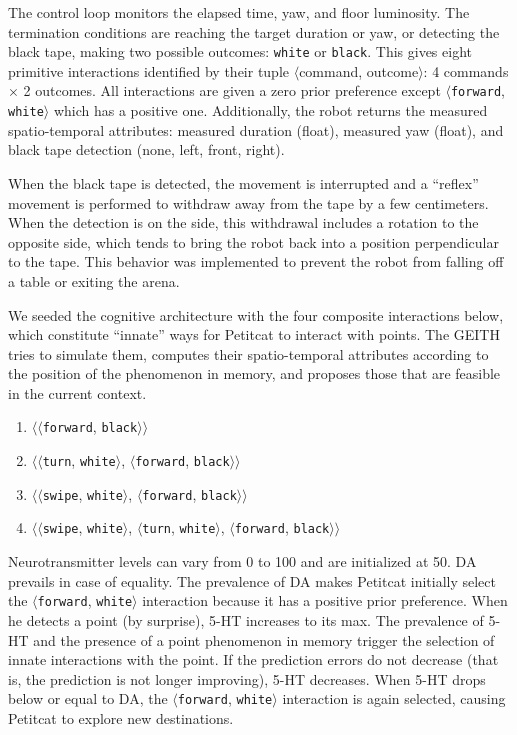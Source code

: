 \documentclass[runningheads]{llncs}
\begin{document}
The control loop monitors the elapsed time, yaw, and floor luminosity. %
The termination conditions are reaching the target duration or yaw, or detecting the black tape, making two possible outcomes: \texttt{white} or \texttt{black}.
This gives eight primitive interactions identified by their tuple $\langle$command, outcome$\rangle$: 4 commands $\times$ 2 outcomes.
All interactions are given a zero prior preference except $\langle$\texttt{forward}, \texttt{white}$\rangle$ which has a positive one.
Additionally, the robot returns the measured spatio-temporal attributes: measured duration (float), measured yaw (float), and black tape detection (none, left, front, right). 

When the black tape is detected, the movement is interrupted and a ``reflex'' movement is performed to withdraw away from the tape by a few centimeters. 
When the detection is on the side, this withdrawal includes a rotation to the opposite side, which tends to bring the robot back into a position perpendicular to the tape. This behavior was implemented to prevent the robot from falling off a table or exiting the arena.

We seeded the cognitive architecture with the four composite interactions below, which constitute ``innate'' ways for Petitcat to interact with points. 
The GEITH tries to simulate them, computes their spatio-temporal attributes according to the position of the phenomenon in memory, and proposes those that are feasible in the current context.
\begin{enumerate}
	\item $\langle\langle$\texttt{forward}, \texttt{black}$\rangle\rangle$
	\item $\langle\langle$\texttt{turn}, \texttt{white}$\rangle$, $\langle$\texttt{forward}, \texttt{black}$\rangle\rangle$
	\item $\langle\langle$\texttt{swipe}, \texttt{white}$\rangle$, $\langle$\texttt{forward}, \texttt{black}$\rangle\rangle$
	\item $\langle\langle$\texttt{swipe}, \texttt{white}$\rangle$, $\langle$\texttt{turn}, \texttt{white}$\rangle$, $\langle$\texttt{forward}, \texttt{black}$\rangle\rangle$
\end{enumerate}

Neurotransmitter levels can vary from 0 to 100 and are initialized at 50. DA prevails in case of equality.
The prevalence of DA makes Petitcat initially select the $\langle$\texttt{forward}, \texttt{white}$\rangle$ interaction because it has a positive prior preference.
When he detects a point (by surprise), 5-HT increases to its max. 
The prevalence of 5-HT and the presence of a point phenomenon in memory trigger the selection of innate interactions with the point.
If the prediction errors do not decrease (that is, the prediction is not longer improving), 5-HT decreases.
When 5-HT drops below or equal to DA, the $\langle$\texttt{forward}, \texttt{white}$\rangle$ interaction is again selected, causing Petitcat to explore new destinations. 
\end{document}
